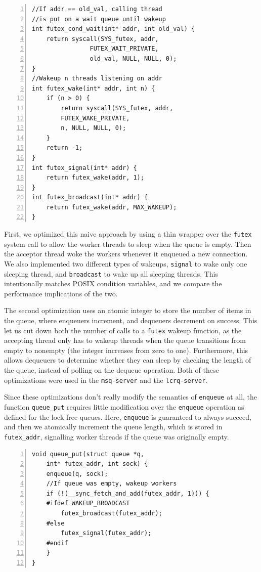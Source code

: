 \documentclass[twoside,10pt]{article}
\begin{document}
\begin{multicols}{2}
\begin{Verbatim}[numbers=left,
                 fontsize=\small]
//If addr == old_val, calling thread
//is put on a wait queue until wakeup
int futex_cond_wait(int* addr, int old_val) {
    return syscall(SYS_futex, addr, 
                FUTEX_WAIT_PRIVATE, 
                old_val, NULL, NULL, 0); 
}
//Wakeup n threads listening on addr
int futex_wake(int* addr, int n) {
    if (n > 0) {
        return syscall(SYS_futex, addr, 
        FUTEX_WAKE_PRIVATE, 
        n, NULL, NULL, 0); 
    }
    return -1;
}
int futex_signal(int* addr) {
    return futex_wake(addr, 1); 
}
int futex_broadcast(int* addr) {
    return futex_wake(addr, MAX_WAKEUP); 
}
\end{Verbatim}

First, we optimized this naive approach by using a thin
wrapper over the \verb+futex+ system call to allow the worker threads
to sleep when the queue is empty. Then the acceptor thread woke the
workers whenever it enqueued a new connection.  We also implemented
two different types of wakeups, \verb+signal+ to wake only one
sleeping thread, and \verb+broadcast+ to wake up all sleeping threads.
This intentionally matches POSIX condition variables, and we compare
the performance implications of the two. 

The second optimization uses
an atomic integer to store the number of items in the queue, where
enqueuers increment, and dequeuers decrement on success. This let us
cut down both the number of calls to a \verb+futex+ wakeup function,
as the accepting thread only has to wakeup threads when the queue
transitions from empty to nonempty (the integer increases from zero to
one). Furthermore, this allows dequeuers to determine whether they can
sleep by checking the length of the queue, instead of polling on the
dequeue operation. Both of these optimizations were used in the
\verb+msq-server+ and the \verb+lcrq-server+. 

Since these optimizations don't really modify the semantics of \verb+enqueue+
at all, the function \verb+queue_put+ requires little modification over 
the \verb+enqueue+ operation as defined for the lock free queues. Here, \verb+enqueue+ is guaranteed to always succeed, and then we atomically increment the queue length, which is stored in \verb+futex_addr+, signalling worker threads if the queue was originally empty.   
\begin{Verbatim}[numbers=left,
                 fontsize=\small]
void queue_put(struct queue *q, 
    int* futex_addr, int sock) {
    enqueue(q, sock); 	
    //If queue was empty, wakeup workers 
    if (!(__sync_fetch_and_add(futex_addr, 1))) {
    #ifdef WAKEUP_BROADCAST
        futex_broadcast(futex_addr); 
    #else 
        futex_signal(futex_addr); 
    #endif 
    }
}
\end{Verbatim}


\end{multicols}
\end{document}
